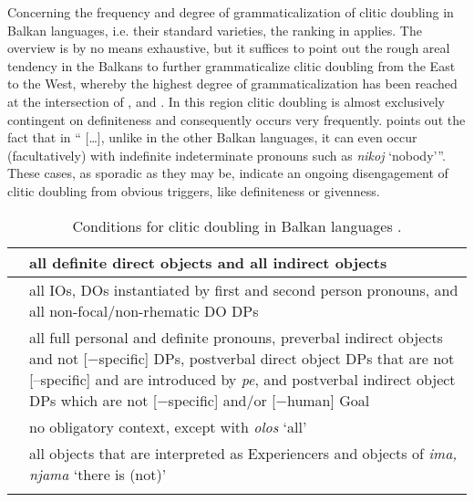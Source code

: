 \documentclass[output=paper]{langsci/langscibook}
\begin{document}
Concerning the frequency and degree of grammaticalization of clitic doubling in Balkan languages, i.e. their standard varieties, the ranking in  applies. The overview is by no means exhaustive, but it suffices to point out the rough areal tendency in the Balkans to further grammaticalize clitic doubling from the East to the West, whereby the highest degree of grammaticalization has been reached at the intersection of ,  and  \parencites{Curtis2012}{Lopasov1978}. In this region clitic doubling is almost exclusively contingent on definiteness and consequently occurs very frequently. \citet[662]{Friedman2006} points out the fact that in \enquote{ […], unlike in the other Balkan languages, it can even occur (facultatively) with indefinite indeterminate pronouns such as \textit{nikoj} ‘nobody’}. These cases, as sporadic as they may be, indicate an ongoing disengagement of clitic doubling from obvious triggers, like definiteness or givenness. 

\begin{table}[ht]
\caption{Conditions for clitic doubling in Balkan languages \citep[9--10]{Kallulli2008}.\label{tab:matoshi:5}}
\begin{tabular}{lL{.75\textwidth}}
\lsptoprule
{} &  all definite direct objects and all indirect objects\\ \midrule
{} & all IOs, DOs instantiated by first and second person pronouns, and all non-focal/non-rhematic DO DPs \\ \midrule
{} & all full personal and definite pronouns, preverbal indirect objects and not [−specific] DPs, postverbal direct object DPs that are not [–specific] and are introduced by \textit{pe}, and postverbal indirect object DPs which are not [−specific] and/or [−human] Goal \\ \midrule
{} & no obligatory context, except with \textit{olos} ‘all’ \\ \midrule
{} & all objects that are interpreted as Experiencers and objects of \textit{ima, njama} ‘there is (not)’\\
\lspbottomrule
\end{tabular}
\end{table}
\end{document}
